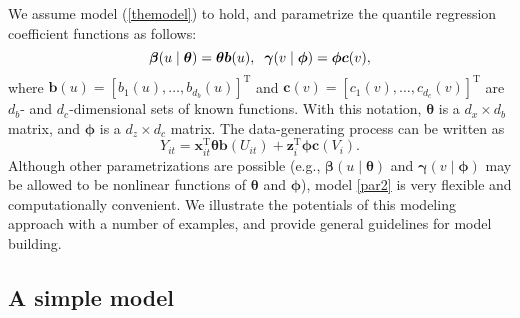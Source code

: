 \documentclass[12pt]{article}
\def\T{{ \mathrm{\scriptscriptstyle T} }}
\def\thetavec{\bm{\theta}}
\def\phivec{\bm{\phi}}
\def\betavec{\bm{\beta}}
\def\gammavec{\bm{\gamma}}
\def\xx{\bm{x}}
\def\zz{\bm{z}}
\def\bvec{\bm{b}}
\def\cvec{\bm{c}}
\begin{document}
We assume model (\ref{themodel}) to hold, and parametrize the quantile regression coefficient functions
as follows:
\begin{equation}\label{par2}
\betavec(u\mid\thetavec) = \thetavec\bvec(u), \hspace{0.2cm} \gammavec(v\mid\phivec) = \phivec\cvec(v),
\end{equation}
where $\bvec(u) = \left[b_1(u), \ldots, b_{d_{b}}(u)\right]^{\T}$ and $\cvec(v) = \left[c_1(v), \ldots, c_{d_{c}}(v)\right]^{\T}$
are $d_{b}$- and $d_{c}$-dimensional sets of known functions. With this notation, $\thetavec$ is a $d_{x}\times d_{b}$ matrix,
and $\phivec$ is a $d_{z}\times d_{c}$ matrix. The data-generating process can be written as
\begin{equation}\label{themodel2}
Y_{it} = \xx_{it}^\T\thetavec\bvec(U_{it}) + \zz_{i}^\T\phivec\cvec(V_i).
\end{equation}
Although other parametrizations are possible (e.g., $\betavec(u\mid\thetavec)$ and $\gammavec(v\mid\phivec)$
may be allowed to be nonlinear functions of $\thetavec$ and $\phivec$),
model \eqref{par2} is very flexible and computationally convenient. We illustrate the potentials
of this modeling approach with a number of examples, and provide general guidelines for model building.


\subsection{A simple model}\label{subsec:simplemodel}
\end{document}
